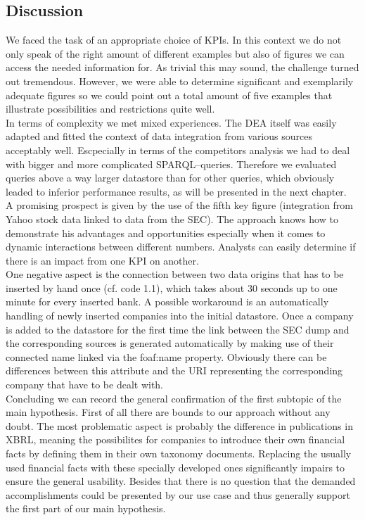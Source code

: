\documentclass[runningheads]{llncs}
\begin{document}
\subsection{Discussion}
We faced the task of an appropriate choice of KPIs. In this context we do not only speak of the right amount of different examples but also of figures we can access the needed information for. As trivial this may sound, the challenge turned out tremendous. However, we were able to determine significant and exemplarily adequate figures so we could point out a total amount of five examples that illustrate possibilities and restrictions quite well. \\
In terms of complexity we met mixed experiences. The DEA itself was easily adapted and fitted the context of data integration from various sources acceptably well. Escpecially in terms of the competitors analysis we had to deal with bigger and more complicated SPARQL--queries. Therefore we evaluated queries above a way larger datastore than for other queries, which obviously leaded to inferior performance results, as will be presented in the next chapter. \\
A promising prospect is given by the use of the fifth key figure (integration from Yahoo stock data linked to data from the SEC). The approach knows how to demonstrate his advantages and opportunities especially when it comes to dynamic interactions between different numbers. Analysts can easily determine if there is an impact from one KPI on another.\\
One negative aspect is the connection between two data origins that has to be inserted by hand once (cf. code 1.1), which takes about 30 seconds up to one minute for every inserted bank. A possible workaround is an automatically handling of newly inserted companies into the initial datastore. Once a company is added to the datastore for the first time the link between the SEC dump and the corresponding sources is generated automatically by making use of their connected name linked via the foaf:name property. Obviously there can be differences between this attribute and the URI representing the corresponding company that have to be dealt with.\\
Concluding we can record the general confirmation of the first subtopic of the main hypothesis. First of all there are bounds to our approach without any doubt. The most problematic aspect is probably the difference in publications in XBRL, meaning the possibilites for companies to introduce their own financial facts by defining them in their own taxonomy documents. Replacing the usually used financial facts with these specially developed ones significantly impairs to ensure the general usability. Besides that there is no question that the demanded accomplishments could be presented by our use case and thus generally support the first part of our main hypothesis.
\end{document}
